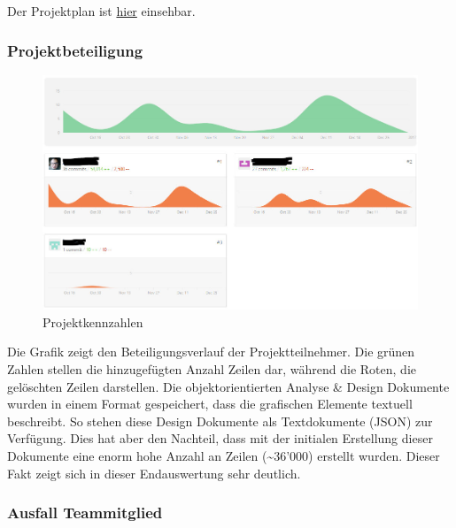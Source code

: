 \documentclass[]{article}
\begin{document}
Der Projektplan ist
\href{https://docs.google.com/spreadsheets/d/1FavRmBRhkSZag9ZJz7cpUHyRiqEvQwWesLXLay4Id8w/edit?usp=sharing}{hier}
einsehbar.

\subsubsection{Projektbeteiligung}\label{projektbeteiligung}

\begin{figure}[H]
\centering
\includegraphics{./WI65_Kennzahlen.jpeg} 
\caption{Projektkennzahlen}
\end{figure}

Die Grafik zeigt den Beteiligungsverlauf der Projektteilnehmer. Die grünen Zahlen stellen die
hinzugefügten Anzahl Zeilen dar, während die Roten, die gelöschten
Zeilen darstellen. Die objektorientierten Analyse \& Design Dokumente
wurden in einem Format gespeichert, dass die grafischen Elemente
textuell beschreibt. So stehen diese Design Dokumente als Textdokumente
(JSON) zur Verfügung. Dies hat aber den Nachteil, dass mit der initialen
Erstellung dieser Dokumente eine enorm hohe Anzahl an Zeilen
(\textasciitilde{}36'000) erstellt wurden. Dieser Fakt zeigt sich in
dieser Endauswertung sehr deutlich.

\subsubsection{Ausfall Teammitglied}\label{ausfall-teammitglied}
\end{document}
